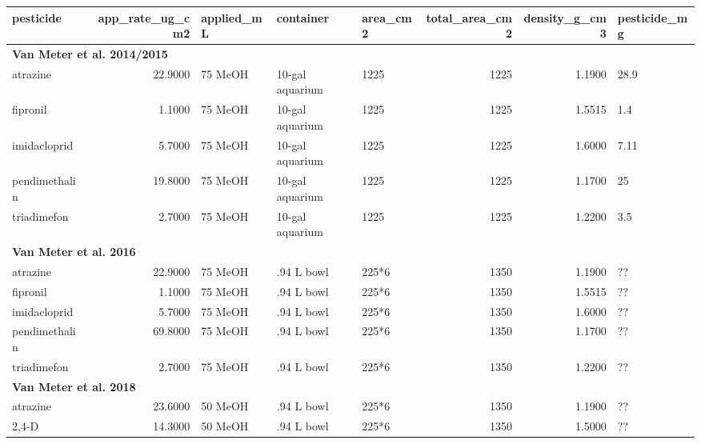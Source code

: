 \documentclass[
]{article}
\begin{document}
\begin{table}
\centering
\begin{tabular}{l|r|l|l|l|r|r|l}
\hline
pesticide & app\_rate\_ug\_cm2 & applied\_mL & container & area\_cm2 & total\_area\_cm2 & density\_g\_cm3 & pesticide\_mg\\
\hline
\multicolumn{8}{l}{\textbf{Van Meter et al. 2014/2015}}\\
\hline
\hspace{1em}atrazine & 22.9000 & 75 MeOH & 10-gal aquarium & 1225 & 1225 & 1.1900 & 28.9\\
\hline
\hspace{1em}fipronil & 1.1000 & 75 MeOH & 10-gal aquarium & 1225 & 1225 & 1.5515 & 1.4\\
\hline
\hspace{1em}imidacloprid & 5.7000 & 75 MeOH & 10-gal aquarium & 1225 & 1225 & 1.6000 & 7.11\\
\hline
\hspace{1em}pendimethalin & 19.8000 & 75 MeOH & 10-gal aquarium & 1225 & 1225 & 1.1700 & 25\\
\hline
\hspace{1em}triadimefon & 2.7000 & 75 MeOH & 10-gal aquarium & 1225 & 1225 & 1.2200 & 3.5\\
\hline
\multicolumn{8}{l}{\textbf{Van Meter et al. 2016}}\\
\hline
\hspace{1em}atrazine & 22.9000 & 75 MeOH & .94 L bowl & 225*6 & 1350 & 1.1900 & ??\\
\hline
\hspace{1em}fipronil & 1.1000 & 75 MeOH & .94 L bowl & 225*6 & 1350 & 1.5515 & ??\\
\hline
\hspace{1em}imidacloprid & 5.7000 & 75 MeOH & .94 L bowl & 225*6 & 1350 & 1.6000 & ??\\
\hline
\hspace{1em}pendimethalin & 69.8000 & 75 MeOH & .94 L bowl & 225*6 & 1350 & 1.1700 & ??\\
\hline
\hspace{1em}triadimefon & 2.7000 & 75 MeOH & .94 L bowl & 225*6 & 1350 & 1.2200 & ??\\
\hline
\multicolumn{8}{l}{\textbf{Van Meter et al. 2018}}\\
\hline
\hspace{1em}atrazine & 23.6000 & 50 MeOH & .94 L bowl & 225*6 & 1350 & 1.1900 & ??\\
\hline
\hspace{1em}2,4-D & 14.3000 & 50 MeOH & .94 L bowl & 225*6 & 1350 & 1.5000 & ??\\

\end{tabular}
\end{table}
\end{document}
